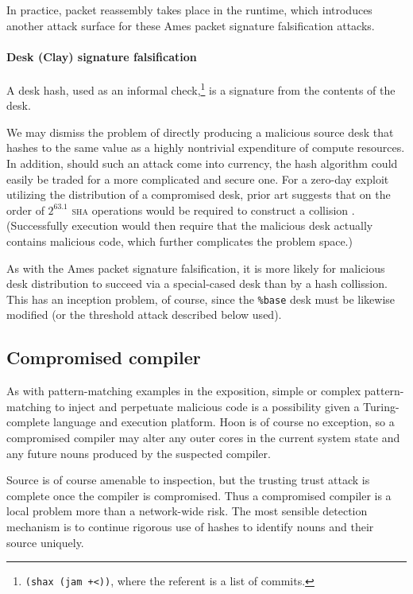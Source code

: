 \documentclass[twoside]{article}
\begin{document}
In practice, packet reassembly takes place in the runtime, which introduces another attack surface for these Ames packet signature falsification attacks.

\paragraph{Desk (Clay) signature falsification}
A desk hash, used as an informal check,\footnote{\lstinline[style=inlinecode]{(shax (jam +<))}, where the referent is a list of commits.} is a signature from the contents of the desk.  

We may dismiss the problem of directly producing a malicious source desk that hashes to the same value as a highly nontrivial expenditure of compute resources.  In addition, should such an attack come into currency, the hash algorithm could easily be traded for a more complicated and secure one.  For a zero-day exploit utilizing the distribution of a compromised desk, prior art suggests that on the order of $2^{63.1}$ \textsc{sha} operations would be required to construct a collision \citep{Stevens2017}.  (Successfully execution would then require that the malicious desk actually contains malicious code, which further complicates the problem space.)

As with the Ames packet signature falsification, it is more likely for malicious desk distribution to succeed via a special-cased desk than by a hash collission.  This has an inception problem, of course, since the \lstinline[style=inlinecode]{%base} desk must be likewise modified (or the threshold attack described below used).


\subsection{Compromised compiler}

As with pattern-matching examples in the exposition, simple or complex pattern-matching to inject and perpetuate malicious code is a possibility given a Turing-complete language and execution platform.  Hoon is of course no exception, so a compromised compiler may alter any outer cores in the current system state and any future nouns produced by the suspected compiler.

Source is of course amenable to inspection, but the trusting trust attack is complete once the compiler is compromised.  Thus a compromised compiler is a local problem more than a network-wide risk.  The most sensible detection mechanism is to continue rigorous use of hashes to identify nouns and their source uniquely.
\end{document}
